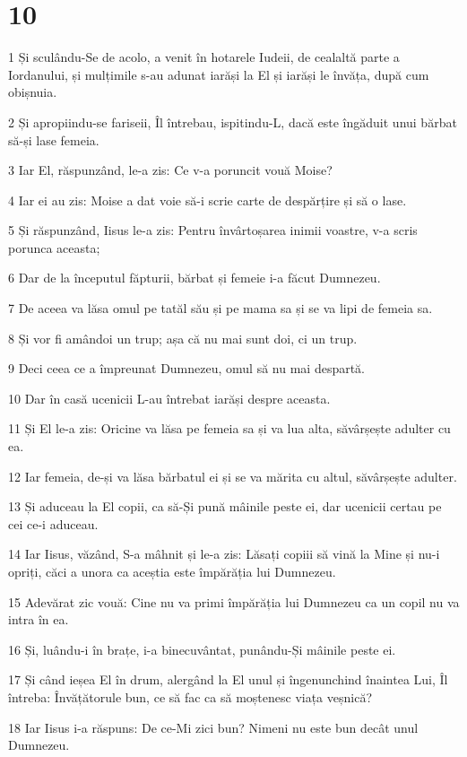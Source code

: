 \chapter{10}

\par 1 Și sculându-Se de acolo, a venit în hotarele Iudeii, de cealaltă parte a Iordanului, și mulțimile s-au adunat iarăși la El și iarăși le învăța, după cum obișnuia.
\par 2 Și apropiindu-se fariseii, Îl întrebau, ispitindu-L, dacă este îngăduit unui bărbat să-și lase femeia.
\par 3 Iar El, răspunzând, le-a zis: Ce v-a poruncit vouă Moise?
\par 4 Iar ei au zis: Moise a dat voie să-i scrie carte de despărțire și să o lase.
\par 5 Și răspunzând, Iisus le-a zis: Pentru învârtoșarea inimii voastre, v-a scris porunca aceasta;
\par 6 Dar de la începutul făpturii, bărbat și femeie i-a făcut Dumnezeu.
\par 7 De aceea va lăsa omul pe tatăl său și pe mama sa și se va lipi de femeia sa.
\par 8 Și vor fi amândoi un trup; așa că nu mai sunt doi, ci un trup.
\par 9 Deci ceea ce a împreunat Dumnezeu, omul să nu mai despartă.
\par 10 Dar în casă ucenicii L-au întrebat iarăși despre aceasta.
\par 11 Și El le-a zis: Oricine va lăsa pe femeia sa și va lua alta, săvârșește adulter cu ea.
\par 12 Iar femeia, de-și va lăsa bărbatul ei și se va mărita cu altul, săvârșește adulter.
\par 13 Și aduceau la El copii, ca să-Și pună mâinile peste ei, dar ucenicii certau pe cei ce-i aduceau.
\par 14 Iar Iisus, văzând, S-a mâhnit și le-a zis: Lăsați copiii să vină la Mine și nu-i opriți, căci a unora ca aceștia este împărăția lui Dumnezeu.
\par 15 Adevărat zic vouă: Cine nu va primi împărăția lui Dumnezeu ca un copil nu va intra în ea.
\par 16 Și, luându-i în brațe, i-a binecuvântat, punându-Și mâinile peste ei.
\par 17 Și când ieșea El în drum, alergând la El unul și îngenunchind înaintea Lui, Îl întreba: Învățătorule bun, ce să fac ca să moștenesc viața veșnică?
\par 18 Iar Iisus i-a răspuns: De ce-Mi zici bun? Nimeni nu este bun decât unul Dumnezeu.
